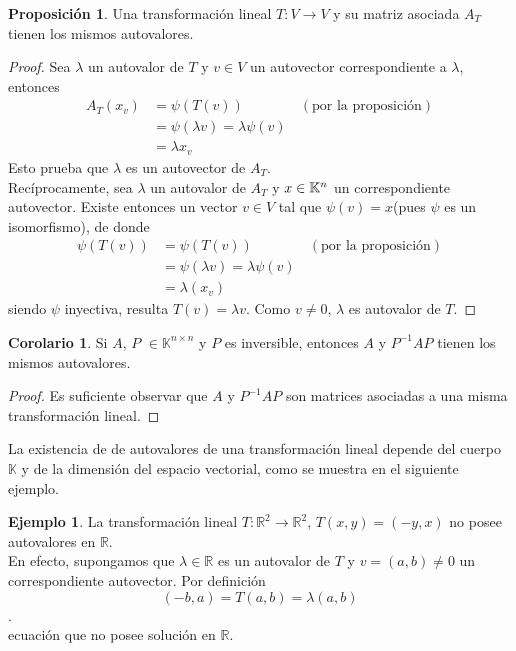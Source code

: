 \documentclass[10pt,a4paper]{article}
\theoremstyle{definition}
\newtheorem{proposition}{Proposición}[section]
\newtheorem{corollary}{Corolario}[section]
\newtheorem{example}{Ejemplo}[section]
\begin{document}
\begin{proposition}
    Una transformación lineal $T: V \rightarrow V$ y su matriz asociada $A_{T}$ tienen  los mismos autovalores.
\end{proposition}

\begin{proof}
	Sea $\lambda$ un autovalor de $T$ y $v \in V$ un autovector correspondiente a $\lambda$, entonces
	\begin{align*}
	A_{T}(x_{v})	& = \psi(T(v)) \qquad\qquad(\text{por la proposición})\\
	& = \psi(\lambda v) = \lambda \psi(v)\\
	& = \lambda x_{v}
	\end{align*}
	Esto prueba que $\lambda$ es un autovector de $A_{T}$. \\
	Recíprocamente, sea $\lambda$ un autovalor de $A_{T}$ y $x \in \mathbb{K}^{n \time 1}$ un correspondiente autovector. Existe entonces un vector $v \in V$ tal que $\psi(v) = x$(pues $\psi$ es un isomorfismo), de donde
	\begin{align*}
	\psi(T(v)) & =  \psi(T(v))\qquad\qquad(\text{por la proposición})\\
	& = \psi(\lambda v) = \lambda \psi(v)\\
	& = \lambda (x_{v})
	\end{align*}
	siendo $\psi$ inyectiva, resulta $T(v) = \lambda v$. Como $v \neq 0$, $\lambda$ es autovalor de $T$.
\end{proof}

\begin{corollary}
Si $A$, $P$ $\in \mathbb{K}^{n \times n}$ y $P$ es inversible, entonces $A$ y $P^{-1}AP$ tienen  los mismos autovalores.
\end{corollary}

\begin{proof}
Es suficiente observar que $A$ y $P^{-1}AP$ son matrices asociadas a una misma transformación lineal.
\end{proof}

\noindent La existencia de de autovalores de una transformación lineal depende del cuerpo $\mathbb{K}$ y de la dimensión del espacio vectorial, como se muestra en el siguiente ejemplo.

\begin{example}
La transformación lineal $T\colon\mathbb{R}^{2} \rightarrow \mathbb{R}^{2}$, $T(x,y)=(-y,x)$ no posee autovalores en $\mathbb{R}$.\\

En efecto, supongamos que $\lambda \in \mathbb{R} $ es un autovalor de $T$ y $v = (a,b) \neq 0$ un correspondiente autovector. Por definición \\

$$(-b,a) = T(a,b) = \lambda(a,b)$$. \\
ecuación que no posee solución en $\mathbb{R}.$
\end{example}
\end{document}
